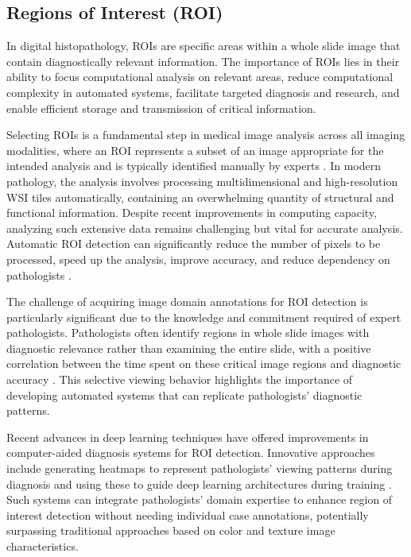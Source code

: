 \subsection{Regions of Interest (ROI)}

In digital histopathology, \glspl{ROI} are specific areas within a
whole slide image that contain diagnostically relevant information.
The importance of \glspl{ROI} lies in their ability to focus
computational analysis on relevant areas, reduce computational
complexity in automated systems, facilitate targeted diagnosis and
research, and enable efficient storage and transmission of critical information.

Selecting \glspl{ROI} is a fundamental step in medical image analysis
across all imaging modalities, where an ROI represents a subset of an
image appropriate for the intended analysis and is typically identified
manually by experts \cite{HossainEtAl2023}. In modern pathology, the
analysis involves processing multidimensional and high-resolution \gls{WSI}
tiles automatically, containing an overwhelming quantity of structural
and functional information. Despite recent improvements in computing
capacity, analyzing such extensive data remains challenging but vital
for accurate analysis. Automatic ROI detection can significantly reduce
the number of pixels to be processed, speed up the analysis, improve
accuracy, and reduce dependency on pathologists \cite{HossainEtAl2023}.

The challenge of acquiring image domain annotations for ROI detection
is particularly significant due to the knowledge and commitment required
of expert pathologists. Pathologists often identify regions in whole
slide images with diagnostic relevance rather than examining the entire
slide, with a positive correlation between the time spent on these
critical image regions and diagnostic accuracy \cite{GhezlooEtAl2025}.
This selective viewing behavior highlights the importance of developing
automated systems that can replicate pathologists' diagnostic patterns.

Recent advances in deep learning techniques have offered improvements
in computer-aided diagnosis systems for ROI detection. Innovative
approaches include generating heatmaps to represent pathologists'
viewing patterns during diagnosis and using these to guide deep learning
architectures during training \cite{GhezlooEtAl2025}. Such systems can
integrate pathologists' domain expertise to enhance region of interest
detection without needing individual case annotations, potentially
surpassing traditional approaches based on color and texture image
characteristics.

